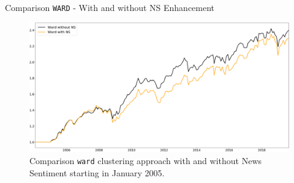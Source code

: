 \begin{frame}{Comparison \texttt{WARD} - With and without NS Enhancement}
\begin{figure}[h]
    \centering
\includegraphics[width=\linewidth]{Figures/perf_noTC_ward_comp_F_2_B_0_LB_12_11_!!}
\caption{Comparison \texttt{ward} clustering approach with and without News Sentiment starting in January 2005.}
\end{figure}
\end{frame}